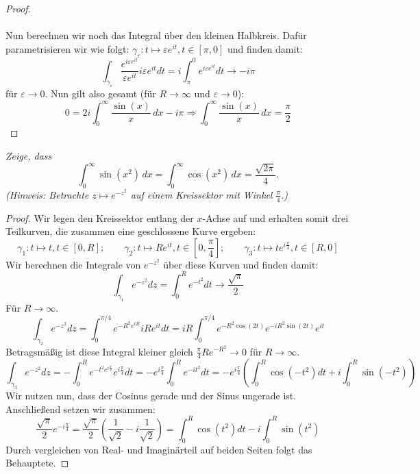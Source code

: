 \documentclass[11pt]{article}
\newenvironment{problem}[2][Beispiel]{
    \begin{trivlist}
        \item[\hskip \labelsep {\bfseries #1}\hskip \labelsep {\bfseries #2.}] \itshape}{
    \end{trivlist}\normalshape
}
\begin{document}
\begin{proof}
        \\\\
        Nun berechnen wir noch das Integral über den kleinen Halbkreis.
        Dafür parametrisieren wir wie folgt: $\gamma_{\varepsilon}: t \mapsto
        \varepsilon e^{it}, t\in[\pi, 0]$ und finden damit:
        $$\int_{\gamma_{\varepsilon}} \frac{e^{i\varepsilon e^{it}}}{\varepsilon e^{it}}
        i\varepsilon e^{it}dt = i\int_{\pi}^0 e^{i\varepsilon e^{it}} dt \to
        -i\pi
        $$
        für $\varepsilon\to 0$. Nun gilt also gesamt (für $R\to\infty$ und
        $\varepsilon\to 0$):
        $$0 = 2i \int_0^{\infty}\frac{\sin(x)}{x}\,dx - i\pi
        \Rightarrow \int_0^{\infty}\frac{\sin(x)}{x}\,dx = \frac{\pi}{2}$$
    \end{proof}

    \begin{problem}{2}
        Zeige, dass
        $$\int_0^\infty \sin(x^2)\,dx = \int_0^\infty\cos(x^2)\,dx = \frac{\sqrt{2\pi}}{4}.$$
        (Hinweis: Betrachte $z\mapsto e^{-z^2}$ auf einem Kreissektor mit Winkel $\frac{\pi}{4}$.)
    \end{problem}

    \begin{proof}
        Wir legen den Kreissektor entlang der $x$-Achse auf und erhalten somit drei Teilkurven,
        die zusammen eine geschlossene Kurve ergeben:
        $$\gamma_1: t\mapsto t, t\in [0,R];\qquad \gamma_2: t\mapsto Re^{it}, t\in \left[0,\frac{\pi}{4}\right];\qquad
        \gamma_3: t\mapsto te^{i\frac{\pi}{4}}, t\in [R,0]$$
        Wir berechnen die Integrale von $e^{-z^2}$ über diese Kurven und finden damit:
        $$\int_{\gamma_1} e^{-z^2}dz = \int_{0}^R e^{-t^2}dt\to \frac{\sqrt{\pi}}{2}$$
        Für $R\to\infty$.
        $$\int_{\gamma_2} e^{-z^2}dz = \int_0^{\pi/4} e^{- R^2 e^{i2t}}iRe^{it}dt =
        iR\int_0^{\pi/4}e^{- R^2\cos(2t)}e^{- iR^2\sin(2t)}e^{it}$$
        Betragsmäßig ist diese Integral kleiner gleich $\frac{\pi}{4} Re^{-R^2}\to 0$ für $R\to\infty$.
        $$\int_{\gamma_3} e^{-z^2}dz = -\int_0^{R} e^{- t^2 e^{i\frac{\pi}{2}}}e^{i\frac{\pi}{4}}dt
        = -e^{i\frac{\pi}{4}}\int_0^{R} e^{-it^2}dt = -e^{i\frac{\pi}{4}}\left(\int_0^R\cos(-t^2)dt +i\int_0^R\sin(-t^2)\right)$$
        Wir nutzen nun, dass der Cosinus gerade und der Sinus ungerade ist. Anschließend setzen wir
        zusammen:
        $$\frac{\sqrt{\pi}}{2}e^{-i\frac{\pi}{4}} = \frac{\sqrt{\pi}}{2}\left(\frac{1}{\sqrt{2}} - i
        \frac{1}{\sqrt{2}}\right)=\int_0^R\cos(t^2)dt -i\int_0^R\sin(t^2)$$
        Durch vergleichen von Real- und Imaginärteil auf beiden Seiten folgt das Behauptete.
    \end{proof}
\end{document}
